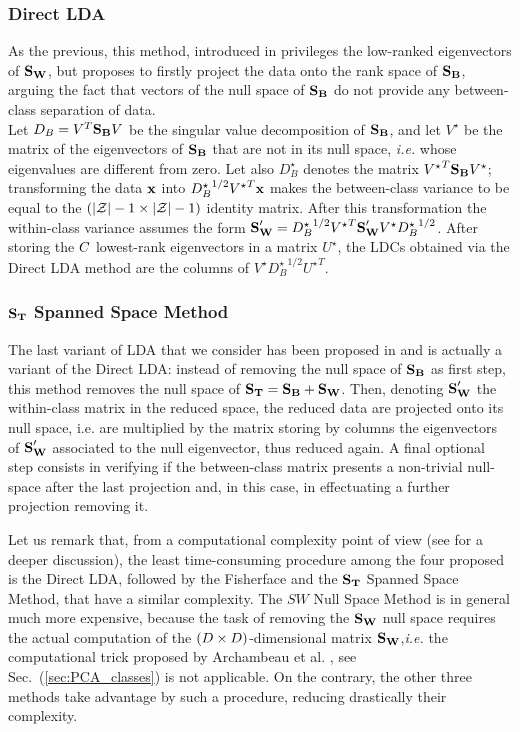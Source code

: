 \subsubsection{Direct LDA}
As the previous, this method, introduced in \cite{Yu01adirect} privileges the low-ranked eigenvectors of $\textbf{S}_{\textbf{W}}$, but proposes to firstly project the data onto the rank space of $\textbf{S}_{\textbf{B}}$, arguing the fact that vectors of the null space of $\textbf{S}_{\textbf{B}}$ do not provide any between-class separation of data. \\
Let $D_B=V^T\textbf{S}_{\textbf{B}} V$ be the singular value decomposition of $\textbf{S}_{\textbf{B}}$, and let $V^\star$ be the matrix of the eigenvectors of $\textbf{S}_{\textbf{B}}$ that are not in its null space, \textit{i.e.} whose eigenvalues are different from zero. Let also $D_B^\star$ denotes the matrix ${V^\star}^T\textbf{S}_{\textbf{B}} V^\star$; transforming the data $\textbf{x}$ into ${D_B^\star}^{1/2}{V^\star}^T\textbf{x}$ makes the between-class variance to be equal to   the $(\lvert \mathcal{Z} \rvert - 1 \times \lvert \mathcal{Z} \rvert - 1)$ identity matrix. After this transformation the within-class variance assumes the form $\textbf{S}_{\textbf{W}}' = {D_B^\star}^{1/2}{V^\star}^T\textbf{S}_{\textbf{W}} ' V^\star {D_B^\star}^{1/2}$. After storing the $C$ lowest-rank eigenvectors in a matrix $U^\star$, the LDCs obtained via the Direct LDA method are the columns of $V^\star{D_B^\star}^{1/2}{U^\star}^T$. 


\subsubsection{$\textbf{S}_{\textbf{T}}$ Spanned Space Method}
The last variant of LDA that we consider has been proposed in \cite{huang} and is actually a variant of the Direct LDA: instead of removing the null space of $\textbf{S}_{\textbf{B}}$ as first step, this method removes the null space of $\textbf{S}_{\textbf{T}} = \textbf{S}_{\textbf{B}} + \textbf{S}_{\textbf{W}}$. Then, denoting $\textbf{S}_{\textbf{W}}'$ the within-class matrix in the reduced space, the reduced data are projected onto its null space, i.e. are multiplied by the matrix storing by columns the eigenvectors of $\textbf{S}_{\textbf{W}}'$ associated to the null eigenvector, thus reduced again. A final optional step consists in verifying if  the between-class matrix presents a non-trivial null-space after the last projection and, in this case, in effectuating a further projection removing it.

\begin{remark}
Let us remark that, from a computational complexity point of view (see \cite{huang} for a deeper discussion), the least time-consuming procedure among the four proposed is the Direct LDA, followed by the Fisherface and the $\textbf{S}_{\textbf{T}}$ Spanned Space Method, that have a similar complexity. The $SW$ Null Space Method is in general much more expensive, because the task of removing the $\textbf{S}_{\textbf{W}}$ null space requires the actual computation of the $(D\times D)$-dimensional matrix $\textbf{S}_{\textbf{W}}$,{\em i.e.} the computational trick proposed by Archambeau et al. \cite{TAprincipal}, see Sec.~(\ref{sec:PCA_classes}) is not applicable. On the contrary, the other three methods take advantage by such a procedure, reducing drastically their complexity.
\end{remark}


